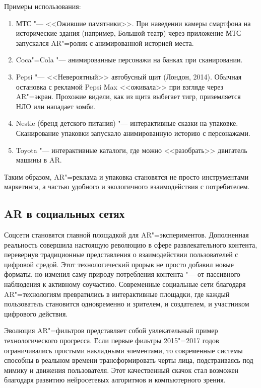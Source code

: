 Примеры использования:
\begin{enumerate}
    \item МТС "--- <<Ожившие памятники>>. При наведении камеры смартфона на исторические здания (например, Большой театр) через приложение МТС запускался AR"=ролик с анимированной историей места.
    \item Coca"=Cola "--- анимированные персонажи на банках при сканировании.
    \item Pepsi "--- <<Невероятный>> автобусный щит (Лондон, 2014). Обычная остановка с рекламой Pepsi Max <<оживала>> при взгляде через AR"=экран. Прохожие видели, как из щита выбегает тигр, приземляется НЛО или нападает зомби.
    \item Nestle (бренд детского питания) "--- интерактивные сказки на упаковке. Сканирование упаковки запускало анимированную историю с персонажами.
    \item Toyota "--- интерактивные каталоги, где можно <<разобрать>> двигатель машины в AR.
\end{enumerate}

Таким образом, AR"=реклама и упаковка становятся не просто инструментами маркетинга, а частью удобного и экологичного взаимодействия с потребителем.

\subsection{AR в социальных сетях}
Соцсети становятся главной площадкой для AR"=экспериментов. Дополненная реальность совершила настоящую революцию в сфере развлекательного контента, перевернув традиционные представления о взаимодействии пользователей с цифровой средой. Этот технологический прорыв не просто добавил новые форматы, но изменил саму природу потребления контента "--- от пассивного наблюдения к активному соучастию. Современные социальные сети благодаря AR"=технологиям превратились в интерактивные площадки, где каждый пользователь становится одновременно и зрителем, и создателем, и участником цифрового действия.

Эволюция AR"=фильтров представляет собой увлекательный пример технологического прогресса. Если первые фильтры 2015"=2017 годов ограничивались простыми накладными элементами, то современные системы способны в реальном времени трансформировать черты лица, подстраиваясь под мимику и движения пользователя. Этот качественный скачок стал возможен благодаря развитию нейросетевых алгоритмов и компьютерного зрения.
